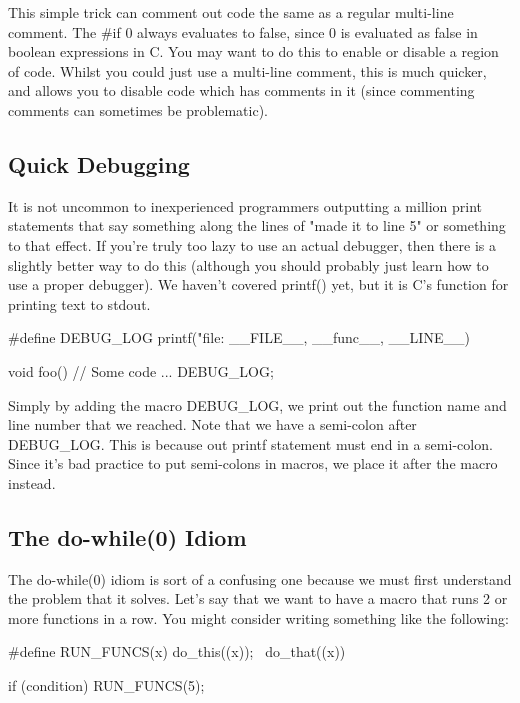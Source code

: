 \documentclass{article}
\begin{document}
This simple trick can comment out code the same as a regular multi-line comment. The \#if 0 always evaluates
to false, since 0 is evaluated as false in boolean expressions in C. You may want to do this to enable or
disable a region of code. Whilst you could just use a multi-line comment, this is much quicker, and allows you
to disable code which has comments in it (since commenting comments can sometimes be problematic).

\subsection{Quick Debugging}

It is not uncommon to inexperienced programmers outputting a million print statements that say something along
the lines of "made it to line 5" or something to that effect. If you're truly too lazy to use an actual
debugger, then there is a slightly better way to do this (although you should probably just learn how to use a
proper debugger). We haven't covered printf() yet, but it is C's function for printing text to stdout.

\begin{cblk}
#define DEBUG_LOG printf("file: %
    __FILE__, __func__, __LINE__)

void foo() {
    // Some code
    ...
    DEBUG_LOG;
}
\end{cblk}

Simply by adding the macro DEBUG\_LOG, we print out the function name and line number that we reached. Note
that we have a semi-colon after DEBUG\_LOG. This is because out printf statement must end in a semi-colon.
Since it's bad practice to put semi-colons in macros, we place it after the macro instead.

\subsection{The do-while(0) Idiom}

The do-while(0) idiom is sort of a confusing one because we must first understand the problem that it solves.
Let's say that we want to have a macro that runs 2 or more functions in a row. You might consider writing
something like the following:

\begin{cblk}
#define RUN_FUNCS(x) do_this((x)); \
                     do_that((x))

if (condition)
    RUN_FUNCS(5);
\end{cblk}
\end{document}
